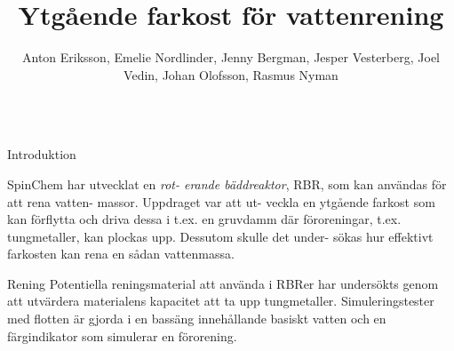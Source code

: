 \documentclass[final]{beamer}
\title{Ytgående farkost för vattenrening}
\author{Anton Eriksson, Emelie Nordlinder, Jenny Bergman,
  Jesper Vesterberg, Joel Vedin, Johan Olofsson, Rasmus Nyman}
\institute{Design-Build-Test Grupp 5, Umeå Universitet}
\newlength{\onecolwid}
\begin{document}

\setlength{\belowcaptionskip}{2ex} %
\setlength\belowdisplayshortskip{2ex} %

\begin{frame}[t]

  \begin{columns}[c]
    \begin{column}{\textwidth}
      \centering
      \vskip 1cm
      \vskip 2cm
    \end{column}
  \end{columns}

  \vspace{2cm}

  \begin{columns}[t, totalwidth=0.99\textwidth]

    \begin{column}{\onecolwid}

      \begin{block}{Introduktion}

        SpinChem har utvecklat en \emph{rot- erande bäddreaktor}, RBR,
        som kan användas för att rena vatten- massor.
        Uppdraget var att ut- veckla
        en ytgående farkost som kan förflytta och driva dessa i t.ex. en gruvdamm
        där föroreningar, t.ex. tungmetaller, kan plockas upp.
        Dessutom skulle det under- sökas hur effektivt farkosten kan rena en
        sådan vattenmassa.

      \end{block}

      \begin{block}{Rening}
        Potentiella reningsmaterial att använda i RBRer har undersökts genom att
        utvärdera materialens kapacitet att ta upp tungmetaller.
        Simuleringstester
        med flotten är gjorda i en bassäng innehållande basiskt vatten och en
        färgindikator som simulerar en förorening.


\end{block}
\end{column}
\end{columns}
\end{frame}
\end{document}
